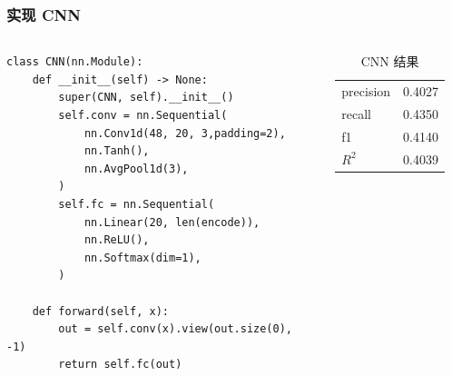 \begin{frame}[fragile]
    \frametitle{实现 CNN}
    \begin{columns}
        \begin{verbatim}
class CNN(nn.Module):
    def __init__(self) -> None:
        super(CNN, self).__init__()
        self.conv = nn.Sequential(
            nn.Conv1d(48, 20, 3,padding=2),
            nn.Tanh(),
            nn.AvgPool1d(3),
        )
        self.fc = nn.Sequential(
            nn.Linear(20, len(encode)),
            nn.ReLU(),
            nn.Softmax(dim=1),
        )

    def forward(self, x):
        out = self.conv(x).view(out.size(0), -1)
        return self.fc(out)
        \end{verbatim}
        \begin{table}
            \caption{CNN 结果}
            \begin{tabular}{ll}
                precision & 0.4027 \\
                recall    & 0.4350 \\
                f1        & 0.4140 \\
                \(R^2\)   & 0.4039 \\
            \end{tabular}
            \label{CNNres}
        \end{table}
    \end{columns}
\end{frame}
